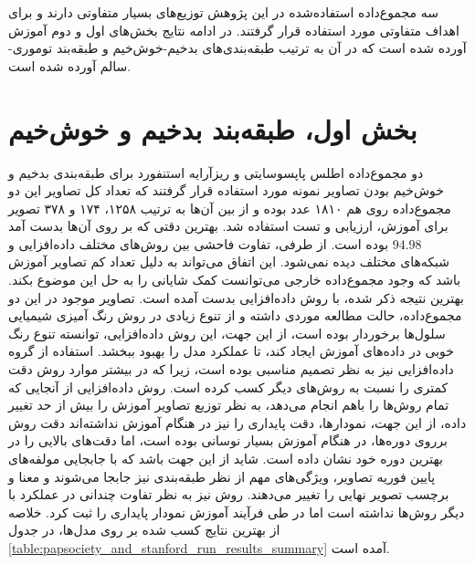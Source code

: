 
سه مجموع‌داده استفاده‌شده در این پژوهش توزیع‌های بسیار متفاوتی دارند و برای اهداف متفاوتی مورد استفاده قرار گرفتند. در ادامه نتایج بخش‌های اول و دوم آموزش آورده شده است که در آن به ترتیب طبقه‌بندی‌های بدخیم-خوش‌خیم و طبقه‌بند توموری-سالم آورده شده است.

\section{بخش اول، طبقه‌بند بدخیم و خوش‌خیم} 
دو مجموع‌داده اطلس پاپسوسایتی و ریزآرایه استنفورد برای طبقه‌بندی بدخیم و خوش‌خیم بودن تصاویر نمونه مورد استفاده قرار گرفتند که تعداد کل تصاویر این دو مجموع‌داده روی هم ۱۸۱۰ عدد بوده و از بین آن‌ها به ترتیب ۱۲۵۸، ۱۷۴ و ۳۷۸ تصویر برای آموزش، ارزیابی و تست استفاده شد. بهترین دقتی که بر روی آن‌ها بدست آمد $94.98$ بوده است.
از طرفی، تفاوت فاحشی بین روش‌های مختلف داده‌افزایی و شبکه‌های مختلف دیده نمی‌شود. این اتفاق می‌تواند به دلیل تعداد کم تصاویر آموزش باشد که وجود مجموع‌داده خارجی می‌‌توانست کمک شایانی را به حل این موضوع بکند.
بهترین نتیجه ذکر شده، با روش داده‌افزایی  بدست آمده است. تصاویر موجود در این دو مجموع‌داده، حالت مطالعه موردی داشته و از تنوع زیادی در روش رنگ آمیزی شیمیایی سلول‌ها برخوردار بوده است، از این جهت، این روش داده‌افزایی، توانسته تنوع رنگ خوبی در داده‌های آموزش ایجاد کند، تا عملکرد مدل را بهبود ببخشد.
استفاده از گروه داده‌افزایی  نیز به نظر تصمیم مناسبی بوده است، زیرا که در بیشتر موارد روش  دقت کمتری را نسبت به روش‌های دیگر کسب کرده است.
روش‌ داده‌افزایی  از آنجایی که تمام روش‌ها را باهم انجام می‌دهد، به نظر توزیع تصاویر آموزش را بیش از حد تغییر داده، از این جهت، نمودارها، دقت پایداری را نیز در هنگام آموزش نداشته‌اند 
دقت روش  برروی دوره‌ها، در هنگام آموزش بسیار نوسانی بوده است، اما دقت‌های بالایی را در بهترین دوره خود نشان داده است. شاید از این جهت باشد که با جابجایی مولفه‌های پایین فوریه تصاویر، ویژگی‌های مهم از نظر طبقه‌بندی نیز جابجا می‌شوند و معنا و برچسب تصویر نهایی را تغییر می‌دهند.
روش  نیز به نظر تفاوت چندانی در عملکرد با دیگر روش‌ها نداشته است اما در طی فرآیند آموزش نمودار پایداری را ثبت کرد.
خلاصه از بهترین نتایج کسب شده بر روی مدل‌ها، در جدول \ref{table:papsociety_and_stanford_run_results_summary} آمده است.
